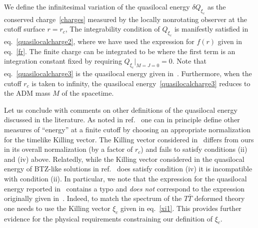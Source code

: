 \documentclass[11pt,a4paper]{article}
\begin{document}
	We define the infinitesimal variation of the quasilocal energy $\delta Q_{\xi_c}$ as the conserved charge~\eqref{charges} measured by the locally nonrotating observer at the cutoff surface $r = r_c$, 
	The integrability condition of $Q_{\xi_c}$ is manifestly satisfied in eq.~\eqref{quasilocalcharge2}, where we have used the expression for $f(r)$ given in eq.~\eqref{fr}. The finite charge can be integrated to be 
	where the first term is an integration constant fixed by requiring $Q_{\xi_c}\big |_{M=J=0}=0$.  Note that eq.~\eqref{quasilocalcharge3} is the quasilocal energy given in~\cite{McGough:2016lol}. Furthermore, when the cutoff $r_c$ is taken to infinity, the quasilocal energy~\eqref{quasilocalcharge3} reduces to the ADM mass $M$ of the spacetime. 
	 
	\noindent Let us conclude with comments on other definitions of the quasilocal energy discussed in the literature. As noted in ref.~\cite{Brown:1994gs} one can in principle define other measures of ``energy'' at a finite cutoff by choosing an appropriate normalization for the timelike Killing vector. The Killing vector considered in~\cite{Brown:1994gs} differs from ours in its overall normalization (by a factor of $r_c$) and fails to satisfy conditions (ii) and (iv) above. Relatedly, while the Killing vector considered in the quasilocal energy of BTZ-like solutions in ref.~\cite{Giribet:2013yka} does satisfy condition (iv) it is incompatible with condition (ii). In particular, we note that the expression for the quasilocal energy reported in~\cite{McGough:2016lol} contains a typo and \emph{does not} correspond to the expression originally given in~\cite{Brown:1994gs}. Indeed, to match the spectrum of the $T\bar{T}$ deformed theory one needs to use the Killing vector $\xi_c$ given in eq.~\eqref{xi1}. This provides further evidence for the physical requirements constraining our definition of $\xi_c$.  
	
	
	\noindent\hrulefill
	
\end{document}
